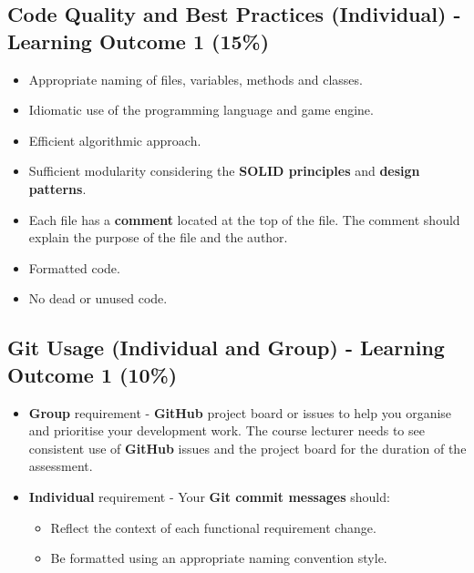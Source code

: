 \documentclass{article}
\begin{document}
\subsection*{Code Quality and Best Practices (Individual) - Learning Outcome 1 (15\%)}
\begin{itemize}
    \item Appropriate naming of files, variables, methods and classes.
    \item Idiomatic use of the programming language and game engine.
    \item Efficient algorithmic approach.
    \item Sufficient modularity considering the \textbf{SOLID principles} and \textbf{design patterns}.
    \item Each file has a \textbf{comment} located at the top of the file. The comment should explain the purpose of the file and the author.
    \item Formatted code.
    \item No dead or unused code.
\end{itemize} 

\subsection*{Git Usage (Individual and Group) - Learning Outcome 1 (10\%)}
\begin{itemize}
	\item \textbf{Group} requirement - \textbf{GitHub} project board or issues to help you organise and prioritise your development work. The course lecturer needs to see consistent use of \textbf{GitHub} issues and the project board for the duration of the assessment. 
	\item \textbf{Individual} requirement - Your \textbf{Git commit messages} should:
    \begin{itemize}
      \item Reflect the context of each functional requirement change.
      \item Be formatted using an appropriate naming convention style. 
    \end{itemize}
\end{itemize}
\end{document}
